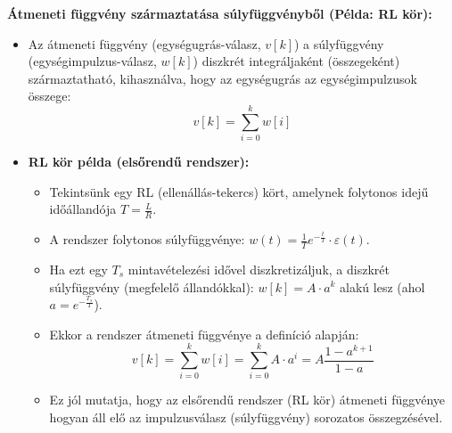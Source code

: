 \noindent \textbf{Átmeneti függvény származtatása súlyfüggvényből (Példa: RL kör):}
\begin{itemize}
    \item Az átmeneti függvény (egységugrás-válasz, $v[k]$) a súlyfüggvény (egységimpulzus-válasz, $w[k]$) diszkrét integráljaként (összegeként) származtatható, kihasználva, hogy az egységugrás az egységimpulzusok összege:
    $$ v[k] = \sum_{i=0}^{k} w[i] $$
    \item \textbf{RL kör példa (elsőrendű rendszer):}
    \begin{itemize}
        \item Tekintsünk egy RL (ellenállás-tekercs) kört, amelynek folytonos idejű időállandója $T = \frac{L}{R}$.
        \item A rendszer folytonos súlyfüggvénye: $w(t) = \frac{1}{T} e^{-\frac{t}{T}} \cdot \varepsilon(t)$.
        \item Ha ezt egy $T_s$ mintavételezési idővel diszkretizáljuk, a diszkrét súlyfüggvény (megfelelő állandókkal): $w[k] = A \cdot a^k$ alakú lesz (ahol $a = e^{-\frac{T_s}{T}}$).
        \item Ekkor a rendszer átmeneti függvénye a definíció alapján:
        $$ v[k] = \sum_{i=0}^{k} w[i] = \sum_{i=0}^{k} A \cdot a^i = A \frac{1-a^{k+1}}{1-a} $$
        \item Ez jól mutatja, hogy az elsőrendű rendszer (RL kör) átmeneti függvénye hogyan áll elő az impulzusválasz (súlyfüggvény) sorozatos összegzésével.
    \end{itemize}
\end{itemize}
